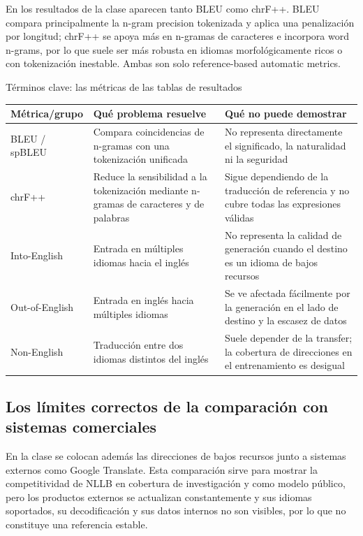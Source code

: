 \documentclass[a4paper]{article}
\begin{document}
En los resultados de la clase aparecen tanto BLEU como chrF++. BLEU compara principalmente la n-gram precision tokenizada y aplica una penalización por longitud; chrF++ se apoya más en n-gramas de caracteres e incorpora word n-grams, por lo que suele ser más robusta en idiomas morfológicamente ricos o con tokenización inestable. Ambas son solo reference-based automatic metrics.

\begin{knowledgebox}{Términos clave: las métricas de las tablas de resultados}
\begin{tabularx}{\textwidth}{@{}L{0.2\textwidth}L{0.27\textwidth}X@{}}
\toprule
Métrica/grupo & Qué problema resuelve & Qué no puede demostrar \\
\midrule
BLEU / spBLEU & Compara coincidencias de n-gramas con una tokenización unificada & No representa directamente el significado, la naturalidad ni la seguridad \\
chrF++ & Reduce la sensibilidad a la tokenización mediante n-gramas de caracteres y de palabras & Sigue dependiendo de la traducción de referencia y no cubre todas las expresiones válidas \\
Into-English & Entrada en múltiples idiomas hacia el inglés & No representa la calidad de generación cuando el destino es un idioma de bajos recursos \\
Out-of-English & Entrada en inglés hacia múltiples idiomas & Se ve afectada fácilmente por la generación en el lado de destino y la escasez de datos \\
Non-English & Traducción entre dos idiomas distintos del inglés & Suele depender de la transfer; la cobertura de direcciones en el entrenamiento es desigual \\
\bottomrule
\end{tabularx}
\end{knowledgebox}

\subsection{Los límites correctos de la comparación con sistemas comerciales}

En la clase se colocan además las direcciones de bajos recursos junto a sistemas externos como Google Translate. Esta comparación sirve para mostrar la competitividad de NLLB en cobertura de investigación y como modelo público, pero los productos externos se actualizan constantemente y sus idiomas soportados, su decodificación y sus datos internos no son visibles, por lo que no constituye una referencia estable.
\end{document}
